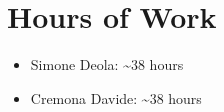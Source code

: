 \section{Hours of Work}
	\begin{itemize}
		\item Simone Deola: \textasciitilde 38 hours
		\item Cremona Davide: \textasciitilde 38 hours
	\end{itemize}